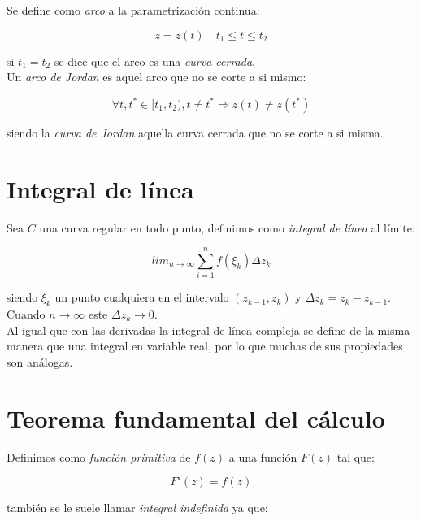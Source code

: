 \documentclass[12pt,a4paper]{book}
\begin{document}
Se define como \textit{arco} a la parametrización continua:

\begin{equation}
z=z(t) \quad t_1 \leq t \leq t_2
\end{equation}

si $t_1 = t_2$ se dice que el arco es una \textit{curva cerrada}.  \\

Un \textit{arco de Jordan} es aquel arco que no se corte a si mismo:

\begin{equation}
\forall t,t^* \in [t_1,t_2), t\neq t^* \Longrightarrow z(t)\neq z(t^*)
\end{equation}

siendo la \textit{curva de Jordan} aquella curva cerrada que no se corte a si misma.

\section{Integral de línea}

Sea $C$ una curva regular en todo punto, definimos como \textit{integral de línea} al límite:

\begin{equation}
lim_{n \rightarrow \infty} \sum_{i=1}^n f( \xi_k) \Delta z_k
\end{equation}

siendo $\xi_k$ un punto cualquiera en el intervalo $(z_{k-1},z_k)$ y $\Delta z_k = z_k-z_{k-1}$.  Cuando $n \rightarrow \infty$ este $\Delta z_k \rightarrow 0$. \\

Al igual que con las derivadas la integral de línea compleja se define de la misma manera que una integral en variable real, por lo que muchas de sus propiedades son análogas. \\

\section{Teorema fundamental del cálculo}

Definimos como \textit{función primitiva} de $f(z)$ a una función $F(z)$ tal que:

\begin{equation}
F'(z) = f(z)
\end{equation}

también se le suele llamar \textit{integral indefinida} ya que:
\end{document}
